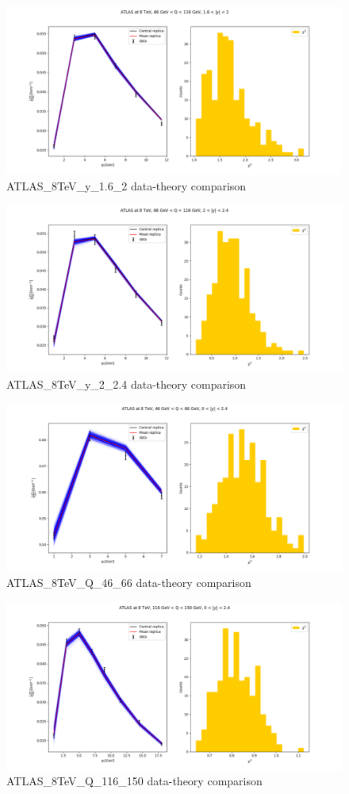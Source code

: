 \documentclass[
]{article}
\begin{document}
\begin{figure}
\centering
\includegraphics{pngplots/ATLAS_8TeV_y_1.6_2.png}
\caption{ATLAS\_8TeV\_y\_1.6\_2 data-theory comparison}
\end{figure}

\begin{figure}
\centering
\includegraphics{pngplots/ATLAS_8TeV_y_2_2.4.png}
\caption{ATLAS\_8TeV\_y\_2\_2.4 data-theory comparison}
\end{figure}

\begin{figure}
\centering
\includegraphics{pngplots/ATLAS_8TeV_Q_46_66.png}
\caption{ATLAS\_8TeV\_Q\_46\_66 data-theory comparison}
\end{figure}

\begin{figure}
\centering
\includegraphics{pngplots/ATLAS_8TeV_Q_116_150.png}
\caption{ATLAS\_8TeV\_Q\_116\_150 data-theory comparison}
\end{figure}
\end{document}
